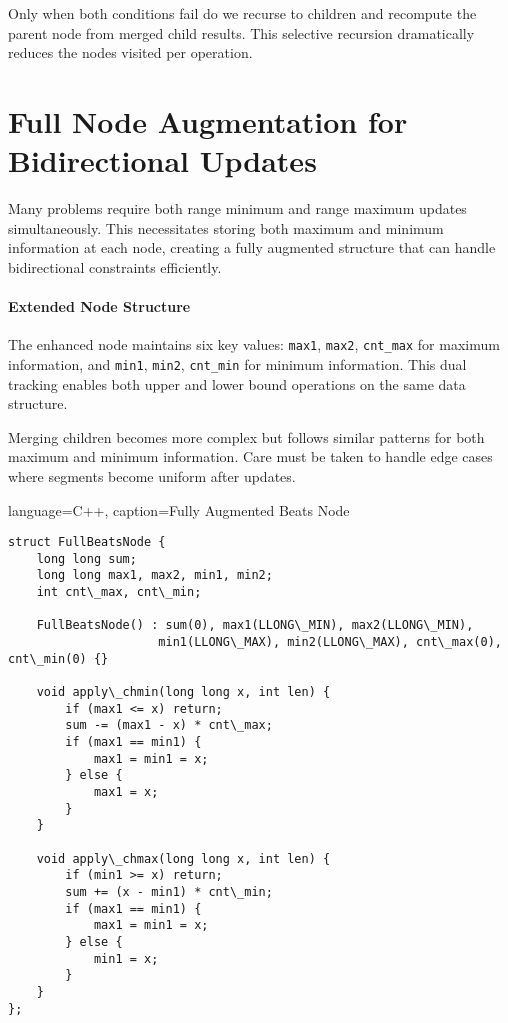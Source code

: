 Only when both conditions fail do we recurse to children and recompute the parent node from merged child results. This selective recursion dramatically reduces the nodes visited per operation.


\section{Full Node Augmentation for Bidirectional Updates}
\label{sec:full_augmentation}

Many problems require both range minimum and range maximum updates simultaneously. This necessitates storing both maximum and minimum information at each node, creating a fully augmented structure that can handle bidirectional constraints efficiently.

\paragraph{Extended Node Structure}

The enhanced node maintains six key values: \texttt{max1}, \texttt{max2}, \texttt{cnt\_max} for maximum information, and \texttt{min1}, \texttt{min2}, \texttt{cnt\_min} for minimum information. This dual tracking enables both upper and lower bound operations on the same data structure.

Merging children becomes more complex but follows similar patterns for both maximum and minimum information. Care must be taken to handle edge cases where segments become uniform after updates.

\begin{marginlisting}[0pt]{language=C++, caption=Fully Augmented Beats Node}
\begin{lstlisting}
struct FullBeatsNode {
    long long sum;
    long long max1, max2, min1, min2;
    int cnt\_max, cnt\_min;
    
    FullBeatsNode() : sum(0), max1(LLONG\_MIN), max2(LLONG\_MIN), 
                     min1(LLONG\_MAX), min2(LLONG\_MAX), cnt\_max(0), cnt\_min(0) {}
    
    void apply\_chmin(long long x, int len) {
        if (max1 <= x) return;
        sum -= (max1 - x) * cnt\_max;
        if (max1 == min1) {
            max1 = min1 = x;
        } else {
            max1 = x;
        }
    }
    
    void apply\_chmax(long long x, int len) {
        if (min1 >= x) return;
        sum += (x - min1) * cnt\_min;
        if (max1 == min1) {
            max1 = min1 = x;
        } else {
            min1 = x;
        }
    }
};
\end{lstlisting}
\end{marginlisting}


